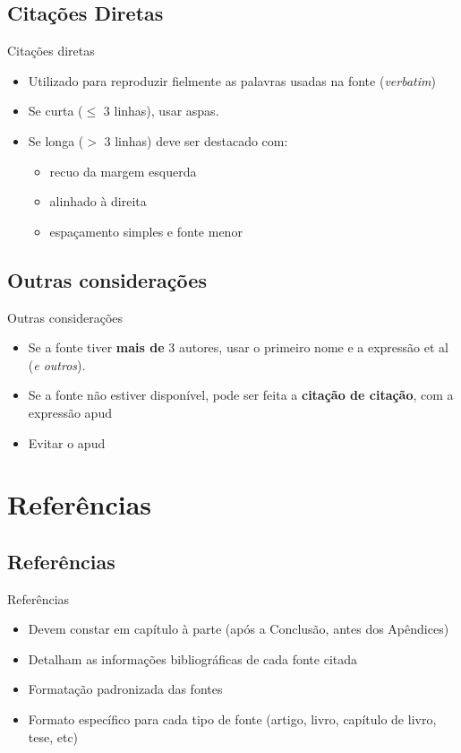 \documentclass{beamer}
\begin{document}
\subsection{Citações Diretas}

\begin{frame}{Citações diretas}
  \begin{itemize}
  \item Utilizado para reproduzir fielmente as palavras usadas na
    fonte ({\em verbatim})
  \item Se curta ($\leq$ 3 linhas), usar aspas.
  \item Se longa ($>$ 3 linhas) deve ser destacado com:
    \begin{itemize}
    \item recuo da margem esquerda
    \item alinhado à direita
    \item espaçamento simples e fonte menor
    \end{itemize}
  \end{itemize}
\end{frame}

\subsection{Outras considerações}

\begin{frame}{Outras considerações}
  \begin{itemize}
  \item Se a fonte tiver {\bf mais de} 3 autores, usar o primeiro nome
    e a expressão \alert{et al} ({\em e outros}).
  \item Se a fonte não estiver disponível, pode ser feita a {\bf
      citação de citação}, com a expressão \alert{apud}
  \item Evitar o apud
  \end{itemize}
\end{frame}

\section{Referências}

\subsection{Referências}

\begin{frame}{Referências}
  \begin{itemize}
  \item Devem constar em capítulo à parte (após a Conclusão, antes dos
    Apêndices)
  \item Detalham as informações bibliográficas de cada fonte citada
  \item Formatação padronizada das fontes
  \item Formato específico para cada tipo de fonte (artigo, livro,
    capítulo de livro, tese, etc)
  \end{itemize}
\end{frame}
\end{document}
